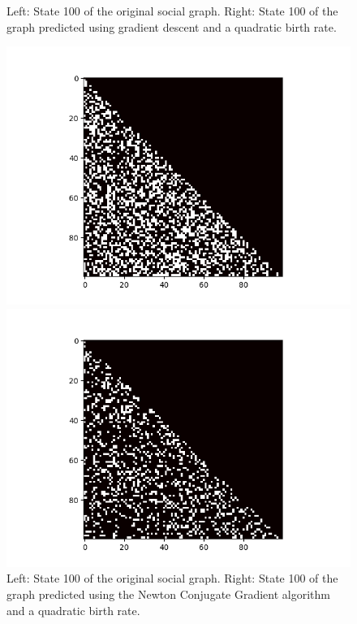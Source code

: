 \begin{figure}
\begin{minipage}{0.49\textwidth}
\begin{center}
        \end{center}
    \end{minipage}
	\caption{
        Left: State 100 of the original social graph.
        Right: State 100 of the graph predicted using gradient descent and a quadratic birth rate.
	}
    \label{fig:sgd-social-square}
\end{figure}

\begin{figure}
    \begin{minipage}{0.49\textwidth}
        \begin{center}
            \includegraphics[scale=0.5]{figures/original-square.png}
        \end{center}
    \end{minipage}
    \begin{minipage}{0.49\textwidth}
        \begin{center}
            \includegraphics[scale=0.5]{figures/newton-square.png}
        \end{center}
    \end{minipage}
	\caption{
        Left: State 100 of the original social graph.
        Right: State 100 of the graph predicted using the Newton Conjugate Gradient algorithm and a quadratic birth rate.
	}
    \label{fig:newton-social-square}
\end{figure}


